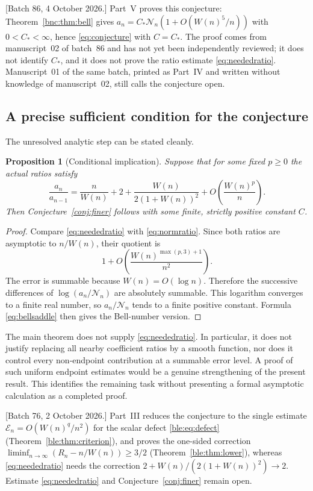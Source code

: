 \documentclass[11pt]{article}
\numberwithin{equation}{section}
\newtheorem{proposition}[theorem]{Proposition}
\theoremstyle{definition}
\theoremstyle{remark}
\begin{document}
[Batch 86, 4 October 2026.] Part~V proves this conjecture:
Theorem~\ref{bnc:thm:bell} gives $a_n=C_*\mathcal N_n(1+O(W(n)^5/n))$
with $0<C_*<\infty$, hence \eqref{eq:conjecture} with $C=C_*$. The proof
comes from manuscript~02 of batch~86 and has not yet been independently
reviewed; it does not identify $C_*$, and it does not prove the ratio
estimate \eqref{eq:neededratio}. Manuscript~01 of the same batch, printed
as Part~IV and written without knowledge of manuscript~02, still calls
the conjecture open.

\subsection{A precise sufficient condition for the conjecture}

The unresolved analytic step can be stated cleanly.
\begin{proposition}[Conditional implication]\label{prop:conditional}
Suppose that for some fixed $p\ge0$ the actual ratios satisfy
\begin{equation}\label{eq:neededratio}
 \frac{a_n}{a_{n-1}}
 =\frac n{W(n)}+2+
     \frac{W(n)}{2(1+W(n))^2}
       +O\!\left(\frac{W(n)^p}{n}\right).
\end{equation}
Then Conjecture~\ref{conj:finer} follows with some finite, strictly
positive constant $C$.
\end{proposition}
\begin{proof}
Compare \eqref{eq:neededratio} with \eqref{eq:normratio}. Since both
ratios are asymptotic to $n/W(n)$, their quotient is
\[
 1+O\!\left(\frac{W(n)^{\max(p,3)+1}}{n^2}\right).
\]
The error is summable because $W(n)=O(\log n)$. Therefore the successive
differences of $\log(a_n/\mathcal N_n)$ are absolutely summable. This
logarithm converges to a finite real number, so $a_n/\mathcal N_n$ tends
to a finite positive constant. Formula \eqref{eq:bellsaddle} then gives
the Bell-number version.
\end{proof}

The main theorem does not supply \eqref{eq:neededratio}. In particular,
it does not justify replacing all nearby coefficient ratios by a smooth
function, nor does it control every non-endpoint contribution at a
summable error level. A proof of such uniform endpoint estimates would
be a genuine strengthening of the present result. This identifies the
remaining task without presenting a formal asymptotic calculation as a
completed proof.

[Batch 76, 2 October 2026.] Part~III reduces the conjecture to the single
estimate $\mathcal E_n=O(W(n)^q/n^2)$ for the scalar defect
\eqref{ble:eq:defect} (Theorem~\ref{ble:thm:criterion}), and proves the
one-sided correction $\liminf_{n\to\infty}(R_n-n/W(n))\ge3/2$
(Theorem~\ref{ble:thm:lower}), whereas \eqref{eq:neededratio} needs the
correction $2+W(n)/(2(1+W(n))^2)\to2$. Estimate \eqref{eq:neededratio} and
Conjecture~\ref{conj:finer} remain open.
\end{document}
